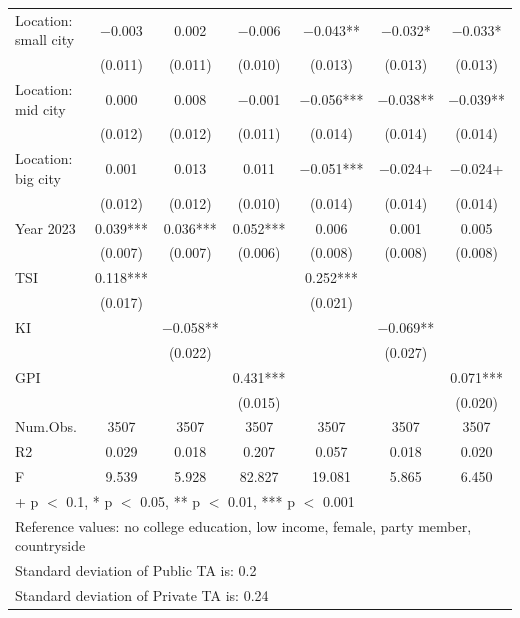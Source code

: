 \documentclass[
  letterpaper,
  DIV=11,
  numbers=noendperiod]{scrartcl}
\begin{document}
\begin{table}
{\begin{tabular}[t]{lcccccc}
Location: small city & \num{-0.003} & \num{0.002} & \num{-0.006} & \num{-0.043}** & \num{-0.032}* & \num{-0.033}*\\
 & (\num{0.011}) & (\num{0.011}) & (\num{0.010}) & (\num{0.013}) & (\num{0.013}) & (\num{0.013})\\
Location: mid city & \num{0.000} & \num{0.008} & \num{-0.001} & \num{-0.056}*** & \num{-0.038}** & \num{-0.039}**\\
 & (\num{0.012}) & (\num{0.012}) & (\num{0.011}) & (\num{0.014}) & (\num{0.014}) & (\num{0.014})\\
Location: big city & \num{0.001} & \num{0.013} & \num{0.011} & \num{-0.051}*** & \num{-0.024}+ & \num{-0.024}+\\
 & (\num{0.012}) & (\num{0.012}) & (\num{0.010}) & (\num{0.014}) & (\num{0.014}) & (\num{0.014})\\
Year 2023 & \num{0.039}*** & \num{0.036}*** & \num{0.052}*** & \num{0.006} & \num{0.001} & \num{0.005}\\
 & (\num{0.007}) & (\num{0.007}) & (\num{0.006}) & (\num{0.008}) & (\num{0.008}) & (\num{0.008})\\
TSI & \num{0.118}*** &  &  & \num{0.252}*** &  & \\
 & (\num{0.017}) &  &  & (\num{0.021}) &  & \\
KI &  & \num{-0.058}** &  &  & \num{-0.069}** & \\
 &  & (\num{0.022}) &  &  & (\num{0.027}) & \\
GPI &  &  & \num{0.431}*** &  &  & \num{0.071}***\\
 &  &  & (\num{0.015}) &  &  & (\num{0.020})\\
\midrule
Num.Obs. & \num{3507} & \num{3507} & \num{3507} & \num{3507} & \num{3507} & \num{3507}\\
R2 & \num{0.029} & \num{0.018} & \num{0.207} & \num{0.057} & \num{0.018} & \num{0.020}\\
F & \num{9.539} & \num{5.928} & \num{82.827} & \num{19.081} & \num{5.865} & \num{6.450}\\
\bottomrule
\multicolumn{7}{l}{\rule{0pt}{1em}+ p $<$ 0.1, * p $<$ 0.05, ** p $<$ 0.01, *** p $<$ 0.001}\\
\multicolumn{7}{l}{\rule{0pt}{1em}Reference values: no college education, low income, female, party member, countryside}\\
\multicolumn{7}{l}{\rule{0pt}{1em}Standard deviation of Public TA is:  0.2}\\
\multicolumn{7}{l}{\rule{0pt}{1em}Standard deviation of Private TA is:  0.24}\\
\end{tabular}

}

\end{table}%
\end{document}
